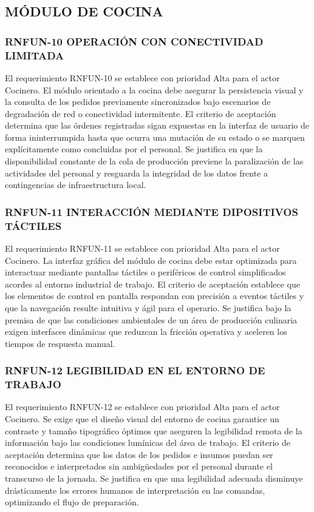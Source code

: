 \subsection{MÓDULO DE COCINA}
\subsubsection{RNFUN-10 OPERACIÓN CON CONECTIVIDAD LIMITADA}
El requerimiento RNFUN-10 se establece con prioridad Alta para el actor Cocinero. El módulo orientado a la cocina debe asegurar la persistencia visual y la consulta de los pedidos previamente sincronizados bajo escenarios de degradación de red o conectividad intermitente. El criterio de aceptación determina que las órdenes registradas sigan expuestas en la interfaz de usuario de forma ininterrumpida hasta que ocurra una mutación de su estado o se marquen explícitamente como concluidas por el personal. Se justifica en que la disponibilidad constante de la cola de producción previene la paralización de las actividades del personal y resguarda la integridad de los datos frente a contingencias de infraestructura local.

\subsubsection{RNFUN-11 INTERACCIÓN MEDIANTE DIPOSITIVOS TÁCTILES}
El requerimiento RNFUN-11 se establece con prioridad Alta para el actor Cocinero. La interfaz gráfica del módulo de cocina debe estar optimizada para interactuar mediante pantallas táctiles o periféricos de control simplificados acordes al entorno industrial de trabajo. El criterio de aceptación establece que los elementos de control en pantalla respondan con precisión a eventos táctiles y que la navegación resulte intuitiva y ágil para el operario. Se justifica bajo la premisa de que las condiciones ambientales de un área de producción culinaria exigen interfaces dinámicas que reduzcan la fricción operativa y aceleren los tiempos de respuesta manual.

\subsubsection{RNFUN-12 LEGIBILIDAD EN EL ENTORNO DE TRABAJO}
El requerimiento RNFUN-12 se establece con prioridad Alta para el actor Cocinero. Se exige que el diseño visual del entorno de cocina garantice un contraste y tamaño tipográfico óptimos que aseguren la legibilidad remota de la información bajo las condiciones lumínicas del área de trabajo. El criterio de aceptación determina que los datos de los pedidos e insumos puedan ser reconocidos e interpretados sin ambigüedades por el personal durante el transcurso de la jornada. Se justifica en que una legibilidad adecuada disminuye drásticamente los errores humanos de interpretación en las comandas, optimizando el flujo de preparación.

